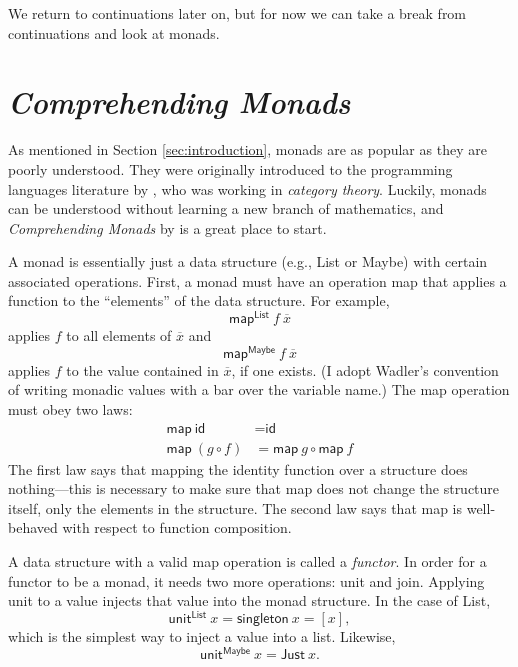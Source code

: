 \documentclass[acmsmall, nonacm, screen]{acmart}
\newcommand{\map}[3]{\textsf{map}^{\textsf{#1}}~#2~#3}
\newcommand{\unit}[2]{\textsf{unit}^{\textsf{#1}}~#2}
\begin{document}
We return to continuations later on, but for now we can take a break from continuations and look
at monads.

\section{{\em Comprehending Monads}} \label{sec:wadler}
As mentioned in Section \ref{sec:introduction}, monads are as popular as they are poorly
understood. They were originally introduced to the programming languages literature by
\citet{moggi1991notions}, who was working in {\em category theory}. Luckily, monads can be
understood without learning a new branch of mathematics, and {\em Comprehending Monads} by
\citet{wadler1990comprehending} is a great place to start.

A monad is essentially just a data structure (e.g., \textsf{List} or \textsf{Maybe}) with certain
associated operations. First, a monad must have an operation \textsf{map} that applies a function
to the ``elements'' of the data structure. For example,
\[ \map{List}{f}{\overline{x}} \]
applies $f$ to all elements of $\overline{x}$ and 
\[ \map{Maybe}{f}{\overline{x}} \]
applies $f$ to the value contained in $\overline{x}$, if one exists. (I adopt Wadler's convention
of writing monadic values with a bar over the variable name.) The \textsf{map} operation must
obey two laws:
\begin{align*}
  \textsf{map}~\textsf{id} &= \textsf{id} \\
  \textsf{map}~(g \circ f) &= \textsf{map}~g \circ \textsf{map}~f
\end{align*}
The first law says that mapping the identity function over a structure does nothing---this is
necessary to make sure that \textsf{map} does not change the structure itself, only the elements
in the structure. The second law says that \textsf{map} is well-behaved with respect to function
composition.

A data structure with a valid \textsf{map} operation is called a {\em functor}. In order for a
functor to be a monad, it needs two more operations: \textsf{unit} and \textsf{join}. Applying
\textsf{unit} to a value injects that value into the monad structure. In the case of
\textsf{List},
\[ \unit{List}{x} = \textsf{singleton}~x = [x], \]
which is the simplest way to inject a value into a list. Likewise,
\[ \unit{Maybe}{x} = \textsf{Just}~x. \]
\end{document}
